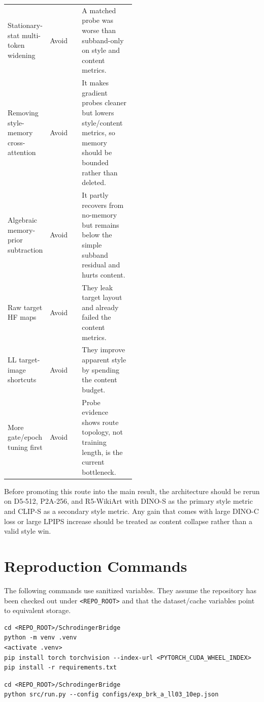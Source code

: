 \documentclass[10pt,twocolumn]{article}
\newcommand{\dinos}{DINO-S}
\newcommand{\dinoc}{DINO-C}
\newcommand{\clips}{CLIP-S}
\begin{document}
\begin{center}
\begin{tabularx}{\linewidth}{p{0.25\linewidth}p{0.25\linewidth}X}
Stationary-stat multi-token widening & Avoid & A matched probe was worse than subband-only on style and content metrics. \\
Removing style-memory cross-attention & Avoid & It makes gradient probes cleaner but lowers style/content metrics, so memory should be bounded rather than deleted. \\
Algebraic memory-prior subtraction & Avoid & It partly recovers from no-memory but remains below the simple subband residual and hurts content. \\
Raw target HF maps & Avoid & They leak target layout and already failed the content metrics. \\
LL target-image shortcuts & Avoid & They improve apparent style by spending the content budget. \\
More gate/epoch tuning first & Avoid & Probe evidence shows route topology, not training length, is the current bottleneck. \\
\bottomrule
\end{tabularx}
\normalsize
\end{center}

Before promoting this route into the main result, the architecture should be rerun on
D5-512, P2A-256, and R5-WikiArt with \dinos{} as the primary style metric and
\clips{} as a secondary style metric. Any gain that comes with large \dinoc{} loss or
large LPIPS increase should be treated as content collapse rather than a valid style win.

\section{Reproduction Commands}

The following commands use sanitized variables. They assume the repository has been
checked out under \texttt{<REPO\_ROOT>} and that the dataset/cache variables point to
equivalent storage.

\begin{lstlisting}[style=cmd,caption={Environment setup}]
cd <REPO_ROOT>/SchrodingerBridge
python -m venv .venv
<activate .venv>
pip install torch torchvision --index-url <PYTORCH_CUDA_WHEEL_INDEX>
pip install -r requirements.txt
\end{lstlisting}

\begin{lstlisting}[style=cmd,caption={Train the D5-512 paper checkpoint}]
cd <REPO_ROOT>/SchrodingerBridge
python src/run.py --config configs/exp_brk_a_ll03_10ep.json
\end{lstlisting}
\end{document}
